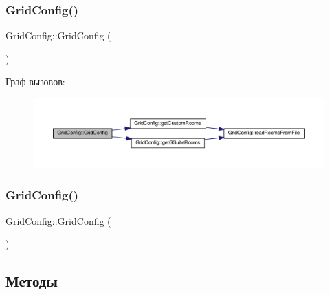 \subsubsection{\texorpdfstring{Grid\+Config()}{GridConfig()}\hspace{0.1cm}{\footnotesize\ttfamily [1/2]}}
{\footnotesize\ttfamily Grid\+Config\+::\+Grid\+Config (\begin{DoxyParamCaption}{ }\end{DoxyParamCaption})\hspace{0.3cm}{\ttfamily [private]}}

Граф вызовов\+:\nopagebreak
\begin{figure}[H]
\begin{center}
\leavevmode
\includegraphics[width=350pt]{class_grid_config_ae61afbd4fe461d0c668e33f2480e9061_cgraph}
\end{center}
\end{figure}
\mbox{\label{class_grid_config_a5a5beaf46b0f41e6387b6378b9cf4b7c}} 
\subsubsection{\texorpdfstring{Grid\+Config()}{GridConfig()}\hspace{0.1cm}{\footnotesize\ttfamily [2/2]}}
{\footnotesize\ttfamily Grid\+Config\+::\+Grid\+Config (\begin{DoxyParamCaption}\item[{const \hyperlink{class_grid_config}{Grid\+Config} \&}]{ }\end{DoxyParamCaption})\hspace{0.3cm}{\ttfamily [private]}}



\subsection{Методы}
\mbox{\label{class_grid_config_acbe684009967e7b8593c7e3303cdfbf5}} 
